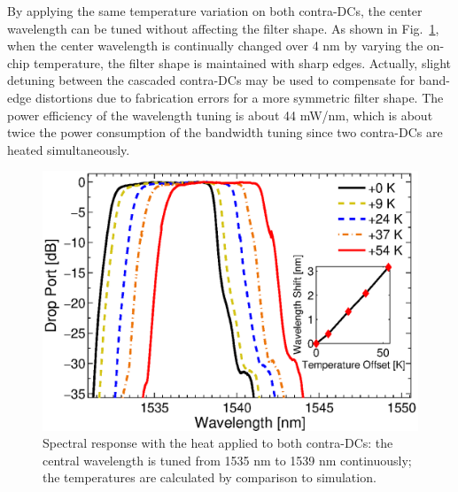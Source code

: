 \documentclass[osajnl,twocolumn,showpacs,superscriptaddress,10pt]{revtex4-1}
\begin{document}
By applying the same temperature variation on both contra-DCs, the center wavelength can be tuned without affecting the filter shape.
As shown in Fig.~\ref{fig:wavTune}, when the center wavelength is continually changed over 4 nm by varying the on-chip temperature, the filter shape is maintained with sharp edges. Actually, slight detuning between the cascaded contra-DCs may be used to compensate for band-edge distortions due to fabrication errors for a more symmetric filter shape. 
The power efficiency of the wavelength tuning is about 44 mW/nm, which is about twice the power consumption of the bandwidth tuning since two contra-DCs are heated simultaneously.
\begin{figure}[htbp]
\centering
\includegraphics[width=.99\columnwidth]{data/Central2}
\caption{Spectral response with the heat applied to both contra-DCs: the central wavelength is tuned from 1535 nm to 1539 nm continuously; the temperatures are calculated by comparison to simulation.}
\label{fig:wavTune}
\end{figure} 



\end{document}
